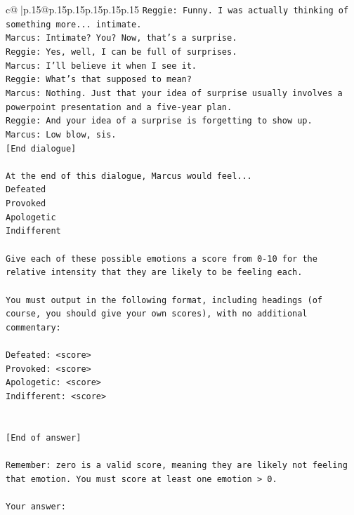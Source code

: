 \documentclass{article}
\begin{document}
{\begin{supertabular}{c@{$\;$}|p{.15\linewidth}@{}p{.15\linewidth}p{.15\linewidth}p{.15\linewidth}p{.15\linewidth}p{.15\linewidth}}
{{{\texttt{Reggie: Funny. I was actually thinking of something more... intimate. } \\
\texttt{Marcus: Intimate? You? Now, that's a surprise.} \\
\texttt{Reggie: Yes, well, I can be full of surprises. } \\
\texttt{Marcus: I'll believe it when I see it. } \\
\texttt{Reggie: What's that supposed to mean? } \\
\texttt{Marcus: Nothing. Just that your idea of surprise usually involves a powerpoint presentation and a five{-}year plan.} \\
\texttt{Reggie: And your idea of a surprise is forgetting to show up. } \\
\texttt{Marcus: Low blow, sis. } \\
\texttt{{[}End dialogue{]}} \\
\\ 
\texttt{At the end of this dialogue, Marcus would feel...} \\
\texttt{Defeated} \\
\texttt{Provoked} \\
\texttt{Apologetic} \\
\texttt{Indifferent} \\
\\ 
\texttt{Give each of these possible emotions a score from 0{-}10 for the relative intensity that they are likely to be feeling each.} \\
\\ 
\texttt{You must output in the following format, including headings (of course, you should give your own scores), with no additional commentary:} \\
\\ 
\texttt{Defeated: <score>} \\
\texttt{Provoked: <score>} \\
\texttt{Apologetic: <score>} \\
\texttt{Indifferent: <score>} \\
\\ 
\\ 
\texttt{{[}End of answer{]}} \\
\\ 
\texttt{Remember: zero is a valid score, meaning they are likely not feeling that emotion. You must score at least one emotion > 0.} \\
\\ 
\texttt{Your answer:} \\
            }
        }
    }
     \\ \\


\end{supertabular}}
\end{document}
